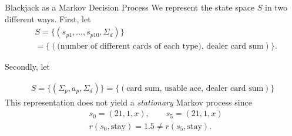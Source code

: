 \begin{frame}{Blackjack as a Markov Decision Process}
We represent the state space $S$ in two different ways.
First, let
\begin{align*}
&S = \{  (s_{p1},\ldots,s_{p10},\Sigma_{d})  \} \\
&= \{ (\text{(number of different cards of each type), dealer card sum}) \}.
\end{align*}

Secondly, let

\begin{align*}
S = \{  (\Sigma_p, a_p, \Sigma_d )  \}=\{  (\text{card sum, usable ace, dealer card sum})  \}
\end{align*}
This representation does not yield a \textit{stationary} Markov process since
\begin{align*}
	&s_0 = (21, 1, x),\qquad s_5 = (21,1,x)\\
	&r(s_0, \text{stay}) = 1.5 \neq r(s_5, \text{stay}). 
\end{align*}


\end{frame}



